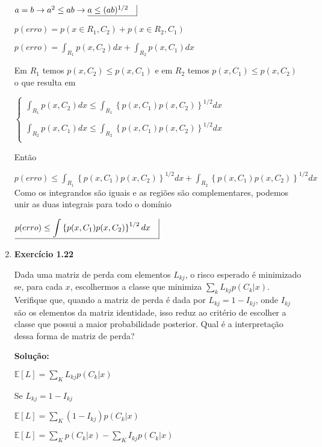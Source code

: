 \begin{enumerate}
    $a=b \rightarrow a^2 \leq a b \rightarrow \underline{a \leq (a b)^{1/2} \quad} \vline $
    
    $p(erro)=p(x \in R_1, C_2)+p(x \in R_2, C_1)$ 
    
    $p(erro)= \displaystyle \int_{R_1} p(x, C_2) dx + \int_{R_2} p(x, C_1) dx$ 
    
    Em $R_1$ temos $p(x, C_2) \leq p(x, C_1)$ e em $R_2$ temos $p(x, C_1) \leq p(x, C_2)$ o que resulta em
    
    $\begin{cases}
        \displaystyle \int_{R_1} p(x, C_2) dx \leq \int_{R_1} \left\{p(x, C_1)p(x, C_2)\right\}^{1/2} dx \\
        \\
        \displaystyle \int_{R_2} p(x, C_1) dx \leq \int_{R_2} \left\{p(x, C_1)p(x, C_2)\right\}^{1/2} dx\\
    \end{cases}$
    
    Então
    
    $p(erro) \leq \displaystyle \int_{R_1} \left\{p(x, C_1)p(x, C_2)\right\}^{1/2} dx + \int_{R_2} \left\{p(x, C_1)p(x, C_2)\right\}^{1/2} dx$ \\
    
    Como os integrandos são iguais e as regiões são complementares, podemos unir as duas integrais para todo o domínio
    
    $\underline{p(erro) \leq \displaystyle \int \left\{p(x, C_1)p(x, C_2)\right\}^{1/2} dx \quad} \vline $
    

\item \textbf{Exercício 1.22} \par

Dada uma matriz de perda com elementos $L_{kj}$, o risco esperado é minimizado se, para cada $x$, escolhermos a classe que minimiza $\sum_{k}^{}L_{kj}p(C_k | x)$. Verifique que, quando a matriz de perda é dada por $L_{kj} = 1 - I_{kj}$, onde $I_{kj}$ são os elementos da matriz identidade, isso reduz ao critério de escolher a classe que possui a maior probabilidade posterior. Qual é a interpretação dessa forma de matriz de perda?
\newline \par
\textbf{Solução:}

$\mathbb{E}[L]=\sum_{K}L_{kj}p(C_k | x)$

Se $L_{kj}=1-I_{kj}$

$\mathbb{E}[L]=\sum_{K}(1-I_{kj})p(C_k | x)$

$\mathbb{E}[L]=\sum_{K}p(C_k | x) - \sum_{K}I_{kj}p(C_k | x)$


\end{enumerate}
